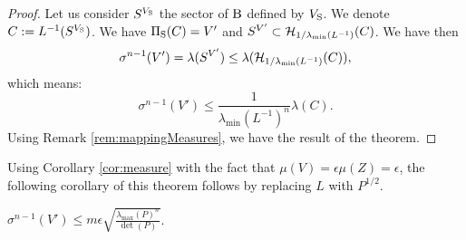 \begin{proof}
Let us consider $S^{V_{\text{S}}}$ the sector of $\text{B}$ defined by $V_{\text{S}}$. We denote $C:= L^{-1}(S^{V_{\text{S}}})$. We have $\Pi_{\text{S}}(C) = V'$ and $S^{V'} \subset \mathcal{H}_{1/ \lambda_{\min}(L^{-1})}(C)$.  We have then 
$$\sigma^{n-1}(V') = \lambda(S^{V'}) \leq \lambda (\mathcal{H}_{1/ \lambda_{\min}(L^{-1})}(C)),$$ which means: $$\sigma^{n-1}(V') \leq \frac{1}{\lambda_{\min}(L^{-1})^n} \lambda(C).$$ Using Remark \ref{rem:mappingMeasures}, we have the result of the theorem.





\end{proof}

Using Corollary \ref{cor:measure} with the fact that $\mu(V) = \epsilon \mu(Z) = \epsilon$, the following corollary of this theorem follows by replacing $L$ with $P^{1/2}$.
\begin{corollary}$\sigma^{n-1}(V') \leq m\epsilon \sqrt{\frac{\lambda_{\max}(P)^n}{\det(P)}}$.
\end{corollary}


